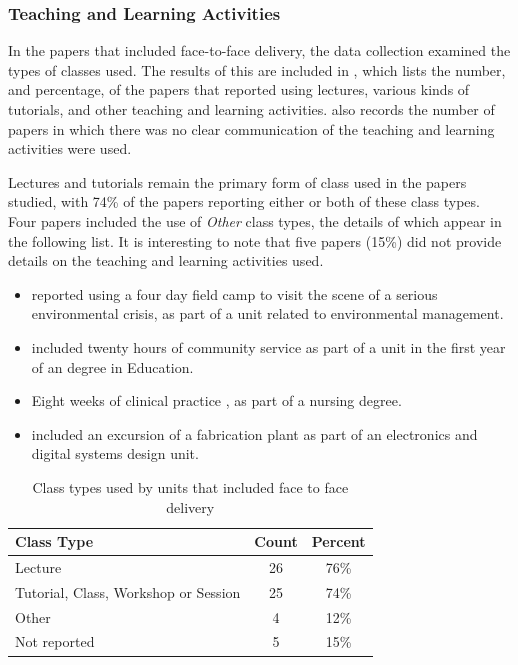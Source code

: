 \subsubsection{Teaching and Learning Activities} %
\label{sub:teaching_and_learning_activities}

In the papers that included face-to-face delivery, the data collection examined the types of classes used. The results of this are included in , which lists the number, and percentage, of the papers that reported using lectures, various kinds of tutorials, and other teaching and learning activities.  also records the number of papers in which there was no clear communication of the teaching and learning activities were used.

Lectures and tutorials remain the primary form of class used in the papers studied, with 74\% of the papers reporting either or both of these class types. Four papers included the use of \emph{Other} class types, the details of which appear in the following list. It is interesting to note that five papers (15\%) did not provide details on the teaching and learning activities used.

\begin{itemize}[noitemsep,nolistsep]
	\item \citet{Szili:2011} reported using a four day field camp to visit the scene of a serious environmental crisis, as part of a unit related to environmental management.
	\item \citet{donnisonre} included twenty hours of community service as part of a unit in the first year of an degree in Education.
	\item Eight weeks of clinical practice \citet{Tang:1999}, as part of a nursing degree.
	\item \citet{Shoufan:2010:CRP:1789934.1789937} included an excursion of a fabrication plant as part of an electronics and digital systems design unit. %
\end{itemize}

\begin{table}[htbp]
	\centering
	\caption{Class types used by units that included face to face delivery}
	\label{tbl:class_types}
	\footnotesize
    \begin{tabular}{l|c|c}
    \textbf{Class Type} & \textbf{Count} & \textbf{Percent} \\ \hline
    Lecture & 26 & 76\% \\
    Tutorial, Class, Workshop or Session & 25 & 74\% \\
    Other & 4 & 12\% \\
    Not reported & 5 & 15\% \\
    \end{tabular}
\end{table}

